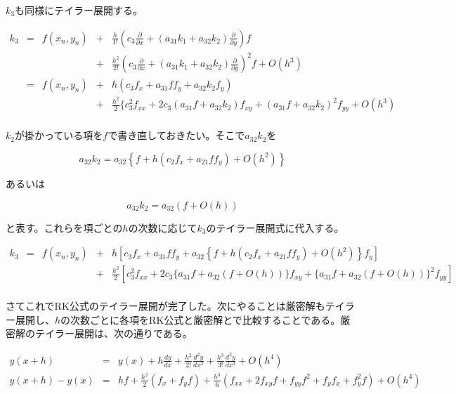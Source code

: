 \(k_3\)も同様にテイラー展開する。

\[
\begin{array}{lclcl}
k_3 & = & f(x_n,y_n) & + & \frac{h}{1!}\left(c_3\frac{\partial}{\partial x} + ( a_{31}k_1 + a_{32}k_2) \frac{\partial}{\partial y}\right)f\\
    &   &            & + & \frac{h^2}{2!}\left(c_3\frac{\partial}{\partial x}+ ( a_{31}k_1 + a_{32}k_2 )\frac{\partial}{\partial y}\right)^2f+O(h^3)\\
    & = & f(x_n,y_n) & + & h (c_3 f_x + a_{31} f f_y + a_{32}k_2 f_y) \\
    &   &            & + & \frac{h^2}{2}\{ c_3^2 f_{xx}+ 2 c_3 ( a_{31}f + a_{32}k_2 )f_{xy} + ( a_{31}f + a_{32}k_2 )^2 f_{yy} + O(h^3)\\
\end{array}
\]

\(k_2\)が掛かっている項を\(f\)で書き直しておきたい。そこで\(a_{32}k_2\)を

\[a_{32}k_2 = a_{32} \left\{ f + h ( c_2 f_x + a_{21} ff_y ) + O(h^2) \right\}\]

あるいは

\[a_{32}k_2 = a_{32} ( f + O(h) )\]

と表す。これらを項ごとの\(h\)の次数に応じて\(k_3\)のテイラー展開式に代入する。

\[
\begin{array}{lclcl}
k_3 & = & f(x_n,y_n) & + & h [ c_3 f_x + a_{31} f f_y + a_{32} \left\{ f + h ( c_2 f_x + a_{21} ff_y ) + O(h^2) \right\} f_y ]\\
    &   &            & + & \frac{h^2}{2} [ c_3^2 f_{xx}+ 2 c_3 \{ a_{31}f + a_{32} ( f + O(h) ) \}f_{xy} + \{ a_{31}f + a_{32} ( f + O(h) ) \}^2 f_{yy}]\\
\end{array}
\]

さてこれでRK公式のテイラー展開が完了した。次にやることは厳密解もテイラー展開し、\(h\)の次数ごとに各項をRK公式と厳密解とで比較することである。厳密解のテイラー展開は、次の通りである。

\[
\begin{array}{rcl}
y(x+h) & = & \displaystyle{ y(x) + h\frac{dy}{dx} + \frac{h^2}{2!}\frac{d^2y}{dx^2} + \frac{h^3}{3!}\frac{d^3y}{dx^3} + O(h^4) }\\
y(x+h) - y(x) & = & \displaystyle{ hf + \frac{h^2}{2}(f_x + f_y f) + \frac{h^3}{6}( f_{xx} + 2f_{xy} f + f_{yy}f^2 + f_yf_x + f_y^2 f ) + O(h^4) }\\
\end{array}
\]

